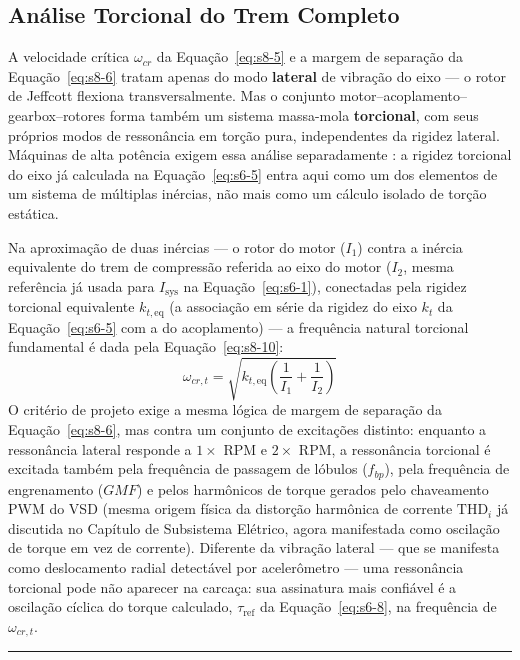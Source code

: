 \documentclass[12pt,a4paper]{article}
\numberwithin{equation}{section}
\numberwithin{table}{section}
\numberwithin{figure}{section}
\begin{document}
{	\subsection{\textbf{Análise Torcional do Trem Completo}}
	A velocidade crítica $\omega_{cr}$ da Equação~\eqref{eq:s8-5} e a margem de separação da Equação~\eqref{eq:s8-6} tratam apenas do modo \textbf{lateral} de vibração do eixo — o rotor de Jeffcott flexiona transversalmente. Mas o conjunto motor–acoplamento–gearbox–rotores forma também um sistema massa-mola \textbf{torcional}, com seus próprios modos de ressonância em torção pura, independentes da rigidez lateral. Máquinas de alta potência exigem essa análise separadamente \cite{api684}: a rigidez torcional do eixo já calculada na Equação~\eqref{eq:s6-5} entra aqui como um dos elementos de um sistema de múltiplas inércias, não mais como um cálculo isolado de torção estática.

	Na aproximação de duas inércias — o rotor do motor ($I_1$) contra a inércia equivalente do trem de compressão referida ao eixo do motor ($I_2$, mesma referência já usada para $I_{\text{sys}}$ na Equação~\eqref{eq:s6-1}), conectadas pela rigidez torcional equivalente $k_{t,\text{eq}}$ (a associação em série da rigidez do eixo $k_t$ da Equação~\eqref{eq:s6-5} com a do acoplamento) — a frequência natural torcional fundamental é dada pela Equação~\eqref{eq:s8-10}:
	\begin{equation}\label{eq:s8-10}
 \omega_{cr,t} = \sqrt{k_{t,\text{eq}} \left( \frac{1}{I_1} + \frac{1}{I_2} \right)}
\end{equation}
	O critério de projeto exige a mesma lógica de margem de separação da Equação~\eqref{eq:s8-6}, mas contra um conjunto de excitações distinto: enquanto a ressonância lateral responde a $1\times$ RPM e $2\times$ RPM, a ressonância torcional é excitada também pela frequência de passagem de lóbulos ($f_{bp}$), pela frequência de engrenamento ($GMF$) e pelos harmônicos de torque gerados pelo chaveamento PWM do VSD (mesma origem física da distorção harmônica de corrente $\text{THD}_i$ já discutida no Capítulo de Subsistema Elétrico, agora manifestada como oscilação de torque em vez de corrente). Diferente da vibração lateral — que se manifesta como deslocamento radial detectável por acelerômetro — uma ressonância torcional pode não aparecer na carcaça: sua assinatura mais confiável é a oscilação cíclica do torque calculado, $\tau_{\text{ref}}$ da Equação~\eqref{eq:s6-8}, na frequência de $\omega_{cr,t}$.

	\vspace{1em}
	\hrule
	\vspace{1em}

}
\end{document}
